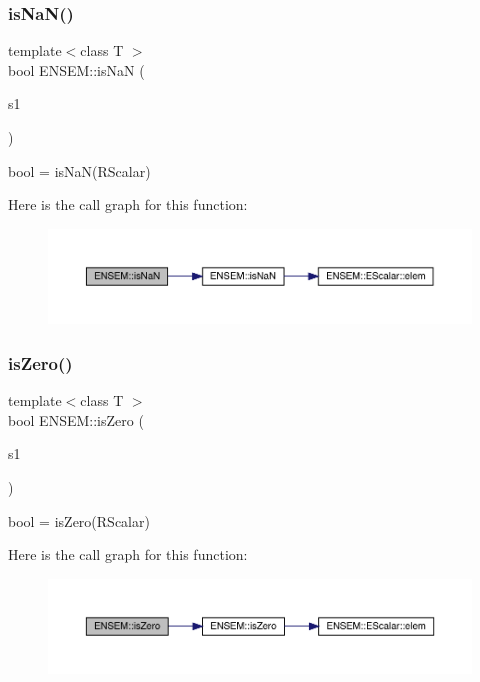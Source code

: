 \subsubsection{\texorpdfstring{isNaN()}{isNaN()}}
{\footnotesize\ttfamily template$<$class T $>$ \\
bool E\+N\+S\+E\+M\+::is\+NaN (\begin{DoxyParamCaption}\item[{const \mbox{\hyperlink{classENSEM_1_1RScalar}{R\+Scalar}}$<$ T $>$ \&}]{s1 }\end{DoxyParamCaption})}



bool = is\+Na\+N(\+R\+Scalar) 

Here is the call graph for this function\+:\nopagebreak
\begin{figure}[H]
\begin{center}
\leavevmode
\includegraphics[width=350pt]{d9/ded/group__rscalar_ga831d3981e39b262a19f78641d8b770c3_cgraph}
\end{center}
\end{figure}
\mbox{\label{group__rscalar_gad963fef363cb9cc2ca365a068821a5ff}} 
\subsubsection{\texorpdfstring{isZero()}{isZero()}}
{\footnotesize\ttfamily template$<$class T $>$ \\
bool E\+N\+S\+E\+M\+::is\+Zero (\begin{DoxyParamCaption}\item[{const \mbox{\hyperlink{classENSEM_1_1RScalar}{R\+Scalar}}$<$ T $>$ \&}]{s1 }\end{DoxyParamCaption})}



bool = is\+Zero(\+R\+Scalar) 

Here is the call graph for this function\+:\nopagebreak
\begin{figure}[H]
\begin{center}
\leavevmode
\includegraphics[width=350pt]{d9/ded/group__rscalar_gad963fef363cb9cc2ca365a068821a5ff_cgraph}
\end{center}
\end{figure}
\mbox{\label{group__rscalar_gadd76bb3801e8a4665498325bf9c7f6ae}} 
